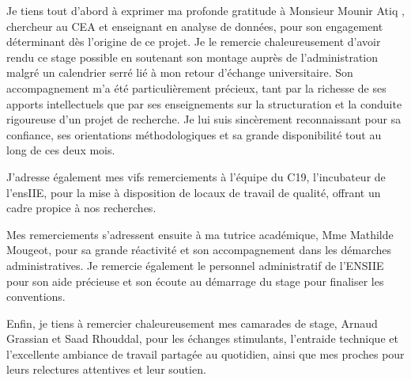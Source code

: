 

Je tiens tout d’abord à exprimer ma profonde gratitude à Monsieur Mounir Atiq , chercheur au CEA et enseignant en analyse de données, pour son engagement déterminant dès l'origine de ce projet. Je le remercie chaleureusement d'avoir rendu ce stage possible en soutenant son montage auprès de l'administration malgré un calendrier serré lié à mon retour d'échange universitaire. Son accompagnement m'a été particulièrement précieux, tant par la richesse de ses apports intellectuels que par ses enseignements sur la structuration et la conduite rigoureuse d'un projet de recherche. Je lui suis sincèrement reconnaissant pour sa confiance, ses orientations méthodologiques et sa grande disponibilité tout au long de ces deux mois.

J'adresse également mes vifs remerciements à l'équipe du C19, l'incubateur de l'ensIIE, pour la mise à disposition de locaux de travail de qualité, offrant un cadre propice à nos recherches.

Mes remerciements s'adressent ensuite à ma tutrice académique, Mme Mathilde Mougeot, pour sa grande réactivité et son accompagnement dans les démarches administratives. Je remercie également le personnel administratif de l'ENSIIE pour son aide précieuse et son écoute au démarrage du stage pour finaliser les conventions.

Enfin, je tiens à remercier chaleureusement mes camarades de stage, Arnaud Grassian et Saad Rhouddal, pour les échanges stimulants, l'entraide technique et l'excellente ambiance de travail partagée au quotidien, ainsi que mes proches pour leurs relectures attentives et leur soutien.
